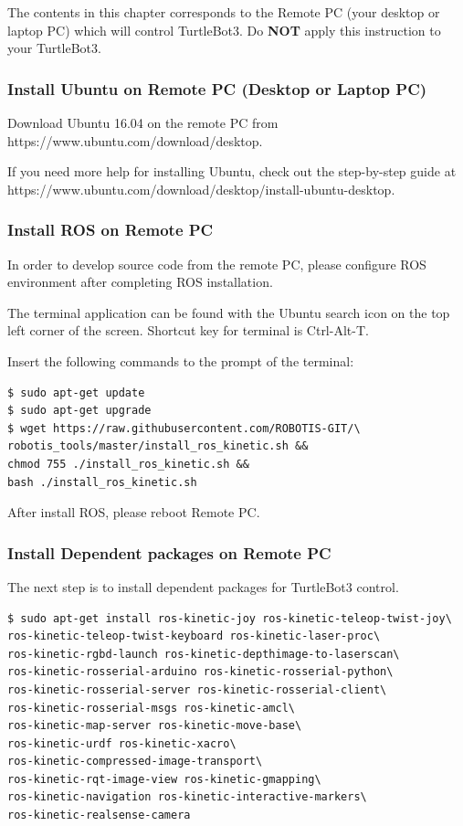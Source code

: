 \documentclass{article}
\begin{document}
The contents in this chapter corresponds to the Remote PC (your desktop or laptop PC) which will control TurtleBot3. Do \textbf{NOT} apply this instruction to your TurtleBot3.

\subsubsection{Install Ubuntu on Remote PC (Desktop or Laptop PC)}

Download Ubuntu 16.04 on the remote PC from https://www.ubuntu.com/download/desktop.

If you need more help for installing Ubuntu, check out the step-by-step guide at https://www.ubuntu.com/download/desktop/install-ubuntu-desktop.

\subsubsection{Install ROS on Remote PC}

In order to develop source code from the remote PC, please configure ROS environment after completing ROS installation.

The terminal application can be found with the Ubuntu search icon on the top left corner of the screen. Shortcut key for terminal is Ctrl-Alt-T.

Insert the following commands to the prompt of the terminal:

\begin{verbatim}
$ sudo apt-get update
$ sudo apt-get upgrade
$ wget https://raw.githubusercontent.com/ROBOTIS-GIT/\
robotis_tools/master/install_ros_kinetic.sh &&
chmod 755 ./install_ros_kinetic.sh &&
bash ./install_ros_kinetic.sh
\end{verbatim}

After install ROS, please reboot Remote PC.

\newpage

\subsubsection{Install Dependent packages on Remote PC}

The next step is to install dependent packages for TurtleBot3 control.

\begin{verbatim}
$ sudo apt-get install ros-kinetic-joy ros-kinetic-teleop-twist-joy\
ros-kinetic-teleop-twist-keyboard ros-kinetic-laser-proc\
ros-kinetic-rgbd-launch ros-kinetic-depthimage-to-laserscan\
ros-kinetic-rosserial-arduino ros-kinetic-rosserial-python\
ros-kinetic-rosserial-server ros-kinetic-rosserial-client\
ros-kinetic-rosserial-msgs ros-kinetic-amcl\
ros-kinetic-map-server ros-kinetic-move-base\
ros-kinetic-urdf ros-kinetic-xacro\
ros-kinetic-compressed-image-transport\
ros-kinetic-rqt-image-view ros-kinetic-gmapping\
ros-kinetic-navigation ros-kinetic-interactive-markers\
ros-kinetic-realsense-camera
\end{verbatim}
\end{document}
